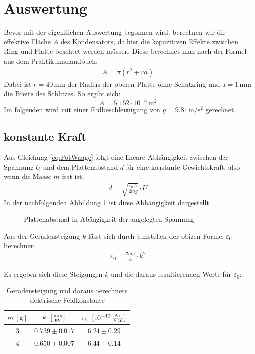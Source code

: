 \documentclass[12pt,a4paper,titlepage,headinclude,bibtotoc]{scrartcl}
\begin{document}
\section{Auswertung}
\label{sec:auswertung}
Bevor mit der eigentlichen Auswertung begonnen wird, berechnen wir die effektive Fläche $A$ des Kondensators, da hier die kapazitiven Effekte zwischen Ring und Platte beachtet werden müssen.
Diese berechnet man nach der Formel aus dem Praktikumshandbuch:
\begin{align*}
 A=\pi (r^2+ra)
\end{align*}
Dabei ist $r=40\,$mm der Radius der oberen Platte ohne Schutzring und $a=1\,$mm die Breite des Schlitzes.
So ergibt sich: $$A=5.152 \cdot 10^{-3}\,\si{\meter^2}$$
Im folgenden wird mit einer Erdbeschleunigung von $g=9.81\,\si{\meter\per\second^2}$ gerechnet.

\subsection{konstante Kraft}
Aus Gleichung \eqref{eq:PotWaage} folgt eine lineare Abhängigkeit zwischen der Spannung $U$ und dem Plattenabstand $d$ für eine konstante Gewichtskraft, also wenn die Masse $m$ fest ist.
\begin{align}
 d= \sqrt{\frac{\varepsilon_0 A}{2mg}} \cdot U
\end{align}
In der nachfolgenden Abbildung \ref{fig:d(U)} ist diese Abhängigkeit dargestellt.
\begin{figure}[!htb]
 \centering
 
 \caption{Plattenabstand in Abängigkeit der angelegten Spannung}
 \label{fig:d(U)}
\end{figure}
Aus der Geradensteigung $k$ lässt sich durch Umstellen der obigen Formel $\varepsilon_0$ berechnen:
\begin{align*}
 \varepsilon_0=\frac{2mg}{A}\cdot k^2
\end{align*}

Es ergeben sich diese Steigungen $k$ und die daraus resultierenden Werte für $\varepsilon_0$:
\begin{table}[!htb]
 \centering
 \begin{tabular}{|c|c|c|}
  \hline
  \rule{0pt}{15pt}$m~[\si{\gram}]$&  $k~\left[\si[per-mode=fraction]{\milli\meter\per\kilo\volt}\right]$ & $\varepsilon_0~\left[10^{-12}\,\si[per-mode=fraction]{\ampere\second\per\volt\per\meter}\right]$\\
  \hline
  $3$ & $0.739\pm 0.017$ & $6.24 \pm 0.29$\\
  $4$ & $0.650\pm 0.007$ & $6.44 \pm 0.14$\\
  \hline
 \end{tabular}
 \caption{Geradensteigung und daraus berechnete elektrische Feldkonstante}
 \label{tab:messung1_k_epsilon0}
\end{table}
\end{document}
